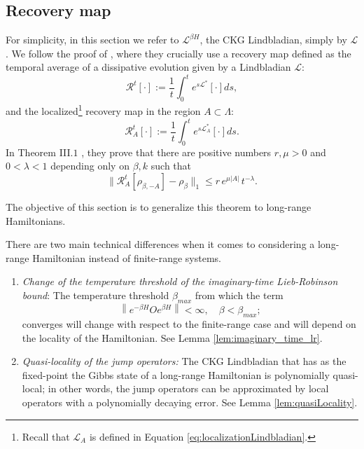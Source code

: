 \documentclass[11pt]{article}
\numberwithin{equation}{section}
\numberwithin{figure}{section}
\numberwithin{table}{section}
\theoremstyle{definition}
\theoremstyle{plain}
\theoremstyle{remark}
\newcommand{\Li}{\mathcal{L}}
\newcommand{\La}{\Lambda}
\newcommand{\norm}[1]{\left\lVert#1\right\rVert}
\begin{document}
\subsection{Recovery map}

For simplicity, in this section we refer to $\mathcal L^{\beta H}$, the CKG Lindbladian, simply by $\mathcal{L}$.
 We follow the proof of \cite{chen_quantum_2025}, where they crucially use a recovery map defined as the temporal average of a dissipative evolution given by a Lindbladian $\Li$:
\begin{equation}
   \mathcal{R}^{t}[\cdot]:=\dfrac{1}{t}\int_0^t e^{s\Li^*}[\cdot ]ds, 
\end{equation}
and the localized\footnote{Recall that $\Li_A$ is defined in Equation \eqref{eq:localizationLindbladian}.} recovery map in the region $A\subset \La$:
\begin{equation}
   \mathcal{R}^{t}_A[\cdot]:=\dfrac{1}{t}\int_0^t e^{s\Li_A^*}[\cdot ]ds.
\end{equation}
In Theorem III.$1$ \cite{chen_quantum_2025}, they prove that there are positive numbers $r, \mu > 0$ and $0 < \lambda < 1$ depending only on $\beta, k$ such that
\begin{equation}
    \bigl\| \mathcal{R}^{t}_A[\rho_{\beta,-A}] - \rho_\beta \bigr\|_1
    \le r \, e^{\mu |A|} \, t^{-\lambda}.
\end{equation}



The objective of this section is to generalize this theorem to long-range Hamiltonians.

There are two main technical differences when it comes to considering a long-range Hamiltonian instead of finite-range systems.
\begin{enumerate}
    \item \textit{Change of the temperature threshold of the imaginary-time Lieb-Robinson bound}: The temperature threshold $\beta_{max}$ from which the term\[\norm{e^{-\beta H}Oe^{\beta H}}<\infty,\quad \beta <\beta_{max};\]converges will change with respect to the finite-range case and will depend on the locality of the Hamiltonian. See Lemma \ref{lem:imaginary_time_lr}.
    \item \textit{Quasi-locality of the jump operators:} The CKG Lindbladian that has as the fixed-point the Gibbs state of a long-range Hamiltonian is polynomially quasi-local; in other words, the jump operators can be approximated by local operators with a polynomially decaying error. See Lemma \ref{lem:quasiLocality}. 
\end{enumerate}
\end{document}
